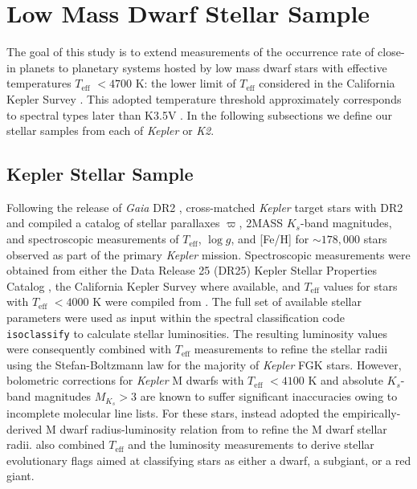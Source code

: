 \documentclass[twocolumn]{emulateapj}
\newcommand{\gaia}[1]{\emph{Gaia}#1}
\newcommand{\kepler}[1]{\emph{Kepler}#1}
\newcommand{\ktwo}[1]{\emph{K2}#1}
\newcommand{\teff}[1]{$T_{\text{eff}}$#1}
\newcommand{\logg}[1]{$\log{g}$#1}
\begin{document}
\section{Low Mass Dwarf Stellar Sample} \label{sect:stars}
The goal of this study is to extend measurements of the occurrence rate of close-in planets to planetary systems hosted
by low mass dwarf stars with effective temperatures \teff{} $<4700$ K: the lower limit of \teff{}
considered in the California Kepler Survey \citep[CKS;][]{fulton17}.
This adopted temperature threshold approximately corresponds to spectral types later than
K3.5V \citep{pecaut13}. In the following subsections we define our stellar samples from each of \kepler{} or \ktwo{.}


\subsection{Kepler Stellar Sample} \label{sect:kep}
Following the release of \gaia{} DR2 \citep{lindegren18}, \cite{berger18} cross-matched \kepler{} target stars
with DR2 and compiled a catalog of stellar
parallaxes $\varpi$, 2MASS $K_s$-band magnitudes, and spectroscopic measurements of \teff{,} \logg{,} and [Fe/H]
for $\sim 178,000$ stars observed as part of the primary \kepler{} mission. Spectroscopic measurements were obtained from
either the Data Release 25 (DR25)
Kepler Stellar Properties Catalog \citep[KSPC;][]{mathur17}, the California
Kepler Survey \citep[CKS;][]{petigura17} where available, and \teff{} values for stars with \teff{} $<4000$ K were compiled from
\cite{gaidos16}. The full set of available stellar parameters were used as input within the spectral classification code
\texttt{isoclassify} \citep{huber17} to calculate stellar luminosities. The resulting luminosity values were consequently combined
with \teff{} measurements to refine the stellar radii using the Stefan-Boltzmann law for the majority of \kepler{} FGK stars.
However, bolometric corrections for \kepler{} M dwarfs with \teff{} $<4100$ K
and absolute $K_s$-band magnitudes $M_{K_s}>3$ are known to suffer significant inaccuracies owing to incomplete
molecular line lists. For these stars, \cite{berger18} instead adopted the empirically-derived M dwarf radius-luminosity
relation from \cite{mann15} to refine the M dwarf stellar radii. \cite{berger18} also combined \teff{} and the 
luminosity measurements to derive stellar evolutionary flags aimed at classifying stars as either a dwarf, a subgiant, or a
red giant.
\end{document}

